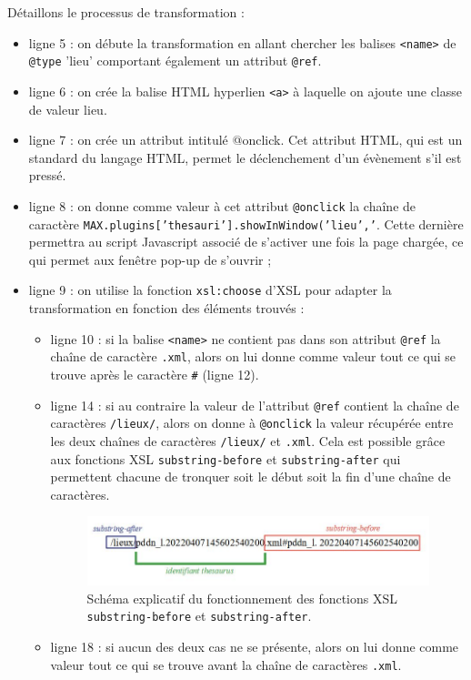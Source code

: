 \documentclass[a4paper,12pt,twoside]{book}
\begin{document}
Détaillons le processus de transformation \label{thesau_xsl}:
\begin{itemize}
    \item ligne 5 : on débute la transformation en allant chercher les balises \texttt{<name>} de \texttt{@type} 'lieu' comportant également un attribut \texttt{@ref}.
    \item ligne 6 : on crée la balise \acrshort{HTML} hyperlien \texttt{<a>} à laquelle on ajoute une classe de valeur \og lieu\fg.
    \item ligne 7 : on crée un attribut intitulé @onclick. Cet attribut \acrshort{HTML}, qui est un standard du langage \acrshort{HTML}, permet le déclenchement d'un évènement s'il est pressé.
    \item ligne 8 : on donne comme valeur à cet attribut \texttt{@onclick} la chaîne de caractère \texttt{MAX.plugins['thesauri'].showInWindow('lieu','}. Cette dernière permettra au script Javascript associé de s'activer une fois la page chargée, ce qui permet aux fenêtre pop-up de s'ouvrir ;
    \item ligne 9 : on utilise la fonction \texttt{xsl:choose} d'\acrshort{XSL} pour adapter la transformation en fonction des éléments trouvés :
    \begin{itemize}
    \item ligne 10 : si la balise \texttt{<name>} ne contient pas dans son attribut \texttt{@ref} la chaîne de caractère \texttt{.xml}, alors on lui donne comme valeur tout ce qui se trouve après le caractère \texttt{\#} (ligne 12).
    \item ligne 14 : si au contraire la valeur de l'attribut \texttt{@ref} contient la chaîne de caractères \texttt{/lieux/}, alors on donne à \texttt{@onclick} la valeur récupérée entre les deux chaînes de caractères \texttt{/lieux/} et \texttt{.xml}. Cela est possible grâce aux fonctions \acrshort{XSL} \texttt{substring-before} et \texttt{substring-after} qui permettent chacune de tronquer soit le début soit la fin d'une chaîne de caractères.
    
    \begin{figure}[H]
        \centering
        \includegraphics[width=13cm]{img/partie_3/lundey_thesau.JPG}
        \caption{Schéma explicatif du fonctionnement des fonctions \acrshort{XSL} \texttt{substring-before} et \texttt{substring-after}.}
    \end{figure}
    
    \item ligne 18 : si aucun des deux cas ne se présente, alors on lui donne comme valeur tout ce qui se trouve avant la chaîne de caractères \texttt{.xml}.
    \end{itemize}
\end{itemize}
\end{document}
